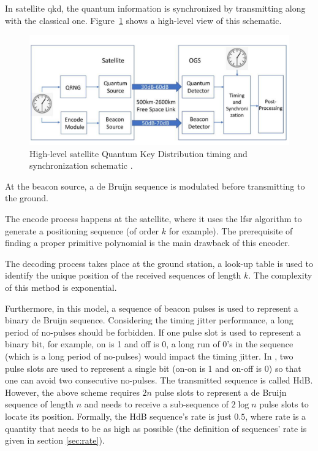 In satellite \gls{qkd}, the quantum information is synchronized by transmitting along with the classical one. Figure~\ref{fig:qkd_satellite} shows a high-level view of this schematic.

\begin{figure}[htbp]
    \centering
    \includegraphics[scale=0.3]{fig/SatelliterQKD.png}
    \caption{High-level satellite Quantum Key Distribution timing and synchronization schematic \cite{zhang2021timing}.}
    \label{fig:qkd_satellite}
\end{figure}

At the beacon source, a de Bruijn sequence is modulated before transmitting to the ground.

The encode process happens at the satellite, where it uses the \gls{lfsr} algorithm to generate a positioning sequence (of order $k$ for example). The prerequisite of finding a proper primitive polynomial is the main drawback of this encoder. 

The decoding process takes place at the ground station, a look-up table is used to identify the unique position of the received sequences of length $k$. The complexity of this method is exponential.

Furthermore, in this model, a sequence of beacon pulses is used to represent a binary de Bruijn sequence. Considering the timing jitter performance, a long period of no-pulses should be forbidden. If one pulse slot is used to represent a binary bit, for example, on is 1 and off is 0, a long run of 0's in the sequence (which is a long period of no-pulses) would impact the timing jitter. In \cite{zhang2021timing}, two pulse slots are used to represent a single bit (on-on is 1 and on-off is 0) so that one can avoid two consecutive no-pulses. The transmitted sequence is called \gls{HdB}. However, the above scheme requires $2n$ pulse slots to represent a de Bruijn sequence of length $n$ and needs to receive a sub-sequence of $2 \log n$ pulse slots to locate its position. Formally, the \gls{HdB} sequence's rate is just $0.5$, where rate is a quantity that needs to be as high as possible (the definition of sequences' rate is given in section \ref{sec:rate}).

